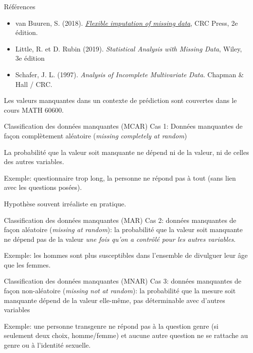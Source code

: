 \documentclass[
  ignorenonframetext,
]{beamer}
\providecommand{\tightlist}{%
  \setlength{\itemsep}{0pt}\setlength{\parskip}{0pt}}\usepackage{longtable,booktabs,array}
\begin{document}
\begin{frame}{Références}
\label{ruxe9fuxe9rences}
\begin{itemize}
\tightlist
\item
  van Buuren, S. (2018).
  \href{https://stefvanbuuren.name/fimd/}{\emph{Flexible imputation of
  missing data}}, CRC Press, 2e édition.
\item
  Little, R. et D. Rubin (2019). \emph{Statistical Analysis with Missing
  Data}, Wiley, 3e édition
\item
  Schafer, J. L. (1997). \emph{Analysis of Incomplete Multivariate
  Data}. Chapman \& Hall / CRC.
\end{itemize}

Les valeurs manquantes dans un contexte de prédiction sont couvertes
dans le cours MATH 60600.
\end{frame}

\begin{frame}{Classification des données manquantes (MCAR)}
\label{classification-des-donnuxe9es-manquantes-mcar}
Cas 1: Données manquantes de façon complètement aléatoire (\emph{missing
completely at random})

La probabilité que la valeur soit manquante ne dépend ni de la valeur,
ni de celles des autres variables.

Exemple: questionnaire trop long, la personne ne répond pas à tout (sans
lien avec les questions posées).

Hypothèse souvent irréaliste en pratique.
\end{frame}

\begin{frame}{Classification des données manquantes (MAR)}
\label{classification-des-donnuxe9es-manquantes-mar}
Cas 2: données manquantes de façon aléatoire (\emph{missing at random}):
la probabilité que la valeur soit manquante ne dépend pas de la valeur
\emph{une fois qu'on a contrôlé pour les autres variables}.

Exemple: les hommes sont plus susceptibles dans l'ensemble de divulguer
leur âge que les femmes.
\end{frame}

\begin{frame}{Classification des données manquantes (MNAR)}
\label{classification-des-donnuxe9es-manquantes-mnar}
Cas 3: données manquantes de façon non-aléatoire (\emph{missing not at
random}): la probabilité que la mesure soit manquante dépend de la
valeur elle-même, pas déterminable avec d'autres variables

Exemple: une personne transgenre ne répond pas à la question genre (si
seulement deux choix, homme/femme) et aucune autre question ne se
rattache au genre ou à l'identité sexuelle.
\end{frame}
\end{document}
